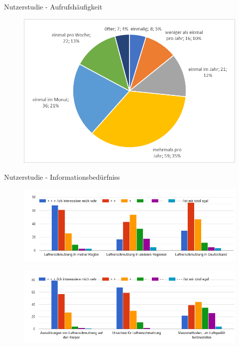 \begin{frame}{Nutzerstudie - Aufrufshäufigkeit}
    \begin{figure}[h]
        \includegraphics[height=0.7\textheight]{../../media/diagram/aufrufe}
    \end{figure}
\end{frame}
\begin{frame}{Nutzerstudie - Informationsbedürfniss}
    \begin{figure}[h]
        \includegraphics[height=0.35\textheight]{../../media/diagram/interesse}
    \end{figure}
    \begin{figure}[h]
        \includegraphics[height=0.35\textheight]{../../media/diagram/interesse2}
    \end{figure}
\end{frame}
